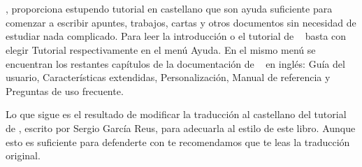 
\chapter{\LyX}
\label{lyx.tex}
\index{\LyX}




\LyX,  proporciona  estupendo tutorial  en  castellano  que son  ayuda
suficiente para comenzar a escribir  apuntes, trabajos, cartas y otros
documentos  sin  necesidad  de  estudiar nada  complicado.  Para  leer
la  introducción  o  el  tutorial  de  \LyX~  basta  con  elegir  {\sf
Tutorial} respectivamente en el menú {\sf  Ayuda}. En el mismo menú se
encuentran los  restantes capítulos  de la  documentación de  \LyX~ en
inglés: {\sf Guía del usuario}, {\sf Características extendidas}, {\sf
Personalización}, {\sf Manual  de referencia} y {\sf  Preguntas de uso
frecuente}.

Lo que sigue es el resultado  de modificar la traducción al castellano
del  tutorial de  \LyX, escrito  por  {\sc Sergio  García Reus},  para
adecuarla  al estilo  de este  libro. Aunque  esto es  suficiente para
defenderte  con  \LyX{} te  recomendamos  que  te leas  la  traducción
original.

